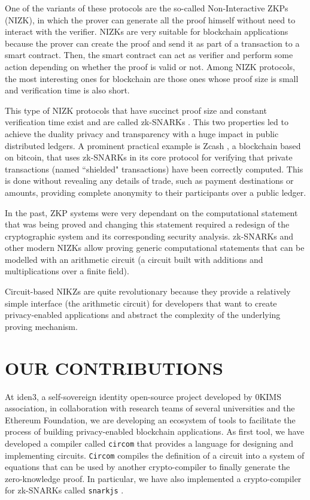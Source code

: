 \documentclass{IEEEcsmag}
\begin{document}
One of the variants of these protocols 
are the so-called Non-Interactive ZKPs (NIZK), in which the prover 
can generate all the proof himself without need to interact 
with the verifier. 
NIZKs are very suitable for blockchain applications because the prover 
can create the proof and send it as part of a transaction to a smart contract.
Then, the smart contract can act as verifier and perform some 
action depending on whether the proof is valid or not.
Among NIZK protocols, the most interesting ones for blockchain are those ones
whose proof size is small and verification time is also short. 


This type of NIZK protocols that have succinct proof size 
and constant verification time exist and are called zk-SNARKs \cite{pinnochio}.  
This two properties led to achieve the duality privacy and transparency
with a huge impact in public distributed ledgers.
A prominent practical example is Zcash \cite{zcash}, a blockchain based on bitcoin,
that uses zk-SNARKs in its core protocol for verifying that private 
transactions (named ``shielded" transactions) have been correctly computed.
This is done without revealing any details of trade, 
such as payment destinations or amounts, providing 
complete anonymity to their participants over a public ledger.

In the past, ZKP systems were very dependant on
the computational statement that was being proved and
changing this statement required a redesign of the cryptographic system and 
its corresponding security analysis.
zk-SNARKs and other modern NIZKs allow proving generic computational statements
that can be modelled with an arithmetic circuit (a circuit built with 
additions and multiplications over a finite field).

Circuit-based NIKZs are quite revolutionary because they
provide a relatively simple interface (the arithmetic circuit) for developers 
that want to create privacy-enabled applications and abstract 
the complexity of the underlying proving mechanism.

\section{OUR CONTRIBUTIONS}

At iden3, a self-sovereign identity open-source project developed by 0KIMS association, in collaboration with research teams of several universities 
and the Ethereum Foundation, we are developing an ecosystem of tools to facilitate 
the process of building privacy-enabled blockchain applications.
As first tool, we have developed a compiler 
called \texttt{circom} \cite{circom} 
that provides a language for designing and implementing circuits.
\texttt{Circom} compiles the definition of a circuit into 
a system of equations that can be used by 
another crypto-compiler to finally generate the zero-knowledge proof. 
In particular, we have also implemented a crypto-compiler for 
zk-SNARKs called \texttt{snarkjs} \cite{snarkjs}.
\end{document}
